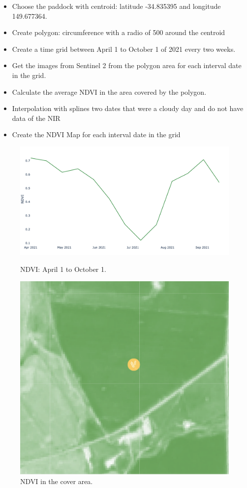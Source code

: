 \documentclass[fleqn,10pt]{wlscirep}
\begin{document}
\begin{itemize}
\setlength\itemsep{0em}
\item Choose the paddock with centroid: latitude -34.835395 and longitude 149.677364.
\item Create polygon: circumference with a radio of 500 around the centroid
\item Create a time grid between April 1 to October 1 of 2021 every two weeks.
\item Get the images from Sentinel 2 from the polygon area for each interval date in the grid.
\item Calculate the average NDVI in the area covered by the polygon. 
\item Interpolation with splines two dates that were a cloudy day and do not have data of the NIR
\item Create the NDVI Map for each interval date in the grid
\end{itemize}
\begin{figure}[!h]
\centering
\begin{minipage}[b]{0.6\textwidth}
\centering
\includegraphics[width=\textwidth]{time.png}
\caption{NDVI: April 1 to October 1.}
\end{minipage}
\hfill
\begin{minipage}[b]{0.35\textwidth}
\includegraphics[width=\textwidth]{crop.png}
\caption{NDVI in the cover area.}
\end{minipage}
\end{figure}
\end{document}
